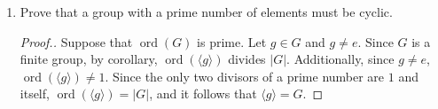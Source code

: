 \documentclass[11pt,twoside]{article}
\newcommand\ord{\operatorname{ord}}
\begin{document}
\begin{enumerate}
\begin{enumerate}
\begin{proof}[\color{red}Proof.]Suppose $g \in G$ and $g \neq e$.  If $\ord(g) = 8$, then $\ord(g^4) = 2$.  Similarly, if $\ord(g) = 4$, then $\ord(g^2) = 2$.  Hence, $G$ must have an element of order $2$.
\end{proof}

\vspace{0.25cm}

\end{enumerate}

\item Prove that a group with a prime number of elements must be cyclic.

\begin{proof}[\color{red}Proof.]Suppose that $\ord(G)$ is prime. Let $g \in G$ and $g \neq e$.  Since $G$ is a finite group, by corollary, $\ord(\langle g \rangle)$ divides $|G|$.  Additionally, since $g \neq e$, $\ord(\langle g \rangle) \neq 1$.  Since the only two divisors of a prime number are $1$ and itself, $\ord(\langle g \rangle) = |G|$, and it follows that $\langle g \rangle = G$.
\end{proof}

\end{enumerate}
\end{document}
